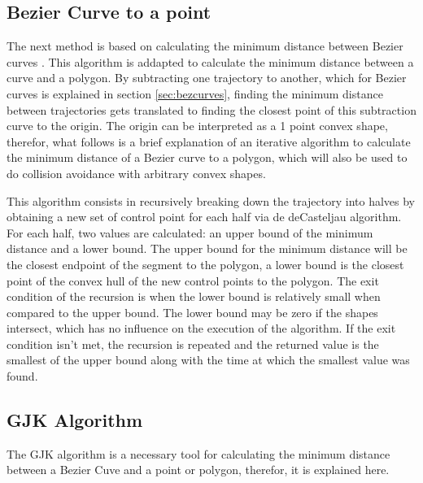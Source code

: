 \subsection{Bezier Curve to a point}
\label{sec:bezcurvetopoint}

\par The next method is based on calculating the minimum distance between Bezier curves \cite{chang2011computation}. This algorithm is addapted to calculate the minimum distance between a curve and a polygon. By subtracting one trajectory to another, which for Bezier curves is explained in section \ref{sec:bezcurves}, finding the minimum distance between trajectories gets translated to finding the closest point of this subtraction curve to the origin. The origin can be interpreted as a 1 point convex shape, therefor, what follows is a brief explanation of an iterative algorithm to calculate the minimum distance of a Bezier curve to a polygon, which will also be used to do collision avoidance with arbitrary convex shapes.

\par This algorithm consists in recursively breaking down the trajectory into halves by obtaining a new set of control point for each half via de deCasteljau algorithm. For each half, two values are calculated: an upper bound of the minimum distance and a lower bound. The upper bound for the minimum distance will be the closest endpoint of the segment to the polygon, a lower bound is the closest point of the convex hull of the new control points to the polygon. The exit condition of the recursion is when the lower bound is relatively small when compared to the upper bound. The lower bound may be zero if the shapes intersect, which has no influence on the execution of the algorithm. If the exit condition isn't met, the recursion is repeated and the returned value is the smallest of the upper bound along with the time at which the smallest value was found.

\subsection{GJK Algorithm}
\label{sec:gjkalg}

\par The \ac{GJK} algorithm is a necessary tool for calculating the minimum distance between a Bezier Cuve and a point or polygon, therefor, it is explained here.

